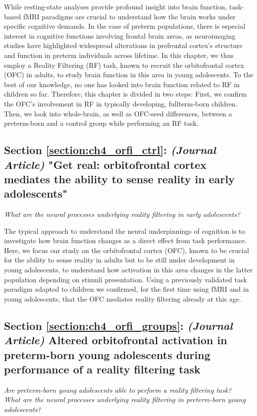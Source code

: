 While resting-state analyses provide profound insight into brain function, task-based fMRI paradigms are crucial to understand how the brain works under specific cognitive demands. In the case of preterm populations, there is especial interest in cognitive functions involving frontal brain areas, as neuroimaging studies have highlighted widespread alterations in prefrontal cortex's structure and function in preterm individuals across lifetime. In this chapter, we thus employ a Reality Filtering (RF) task, known to recruit the orbitofrontal cortex (OFC) in adults, to study brain function in this area in young adolescents. To the best of our knowledge, no one has looked into brain function related to RF in children so far. Therefore, this chapter is divided in two steps: First, we confirm the OFC's involvement in RF in typically developing, fullterm-born children. Then, we look into whole-brain, as well as OFC-seed differences, between a preterm-born and a control group while performing an RF task.

\subsection*{Section \ref{section:ch4_orfi_ctrl}: \textit{(Journal Article)} "Get real: orbitofrontal cortex mediates the ability to sense reality in early adolescents"}
\textit{What are the neural processes underlying reality filtering in early adolescents?}

The typical approach to understand the neural underpinnings of cognition is to investigate how brain function changes as a direct effect from task performance. Here, we focus our study on the orbitofrontal cortex (OFC), known to be crucial for the ability to sense reality in adults but to be still under development in young adolescents, to understand how activation in this area changes in the latter population depending on stimuli presentation. Using a previously validated task paradigm adapted to children we confirmed, for the first time using fMRI and in young adolescents, that the OFC mediates reality filtering already at this age.

\subsection*{Section \ref{section:ch4_orfi_groups}: \textit{(Journal Article)} Altered orbitofrontal activation in preterm-born young adolescents during performance of a reality filtering task}
\textit{Are preterm-born young adolescents able to perform a reality filtering task?}\\
\textit{What are the neural processes underlying reality filtering in preterm-born young adolescents?}

